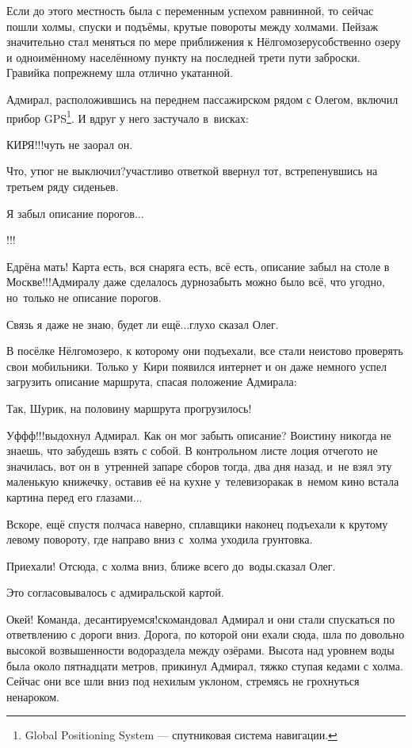 Если до этого местность была с переменным успехом равнинной, то сейчас пошли холмы, спуски и подъёмы, крутые повороты между холмами. Пейзаж значительно стал меняться по мере приближения к Нёлгомозеру\mdash собственно озеру и одноимённому населённому пункту на последней трети пути заброски. Гравийка по\sdash прежнему шла отлично укатанной.

Адмирал, расположившись на переднем пассажирском рядом с Олегом, включил прибор GPS\footnote{Global Positioning System --- спутниковая система навигации.}. И вдруг у него застучало в~висках:

\diagdash КИРЯ!!!\mdash чуть не заорал он.

\diagdash Что, утюг не выключил?\mdash участливо ответкой ввернул тот, встрепенувшись на третьем ряду сиденьев.

\diagdash Я забыл описание порогов$\ldots$

\diagdash !!!

\diagdash Едрёна мать! Карта есть, вся снаряга есть, всё есть, описание забыл на столе в Москве!!!\mdash Адмиралу даже сделалось дурно\mdash забыть можно было всё, что угодно, но~только не описание порогов. 

\diagdash Связь я даже не знаю, будет ли ещё$\ldots$\mdash глухо сказал Олег.

В посёлке Нёлгомозеро, к которому они подъехали, все стали неистово проверять свои мобильники. Только у~Кири появился интернет и он даже немного успел загрузить описание маршрута, спасая положение Адмирала:

\diagdash Так, Шурик, на половину маршрута прогрузилось!

\diagdash Уф\sdash ф\sdash ф!!!\mdash выдохнул Адмирал. Как он мог забыть описание? Воистину никогда не знаешь, что забудешь взять с собой. В контрольном листе лоция отчего\sdash то не значилась, вот он в~утренней запаре сборов тогда, два дня назад, и~не взял эту маленькую книжечку, оставив её на кухне у~телевизора\mdash как в~немом кино встала картина перед его глазами$\ldots$

Вскоре, ещё спустя полчаса наверно, сплавщики наконец подъехали к крутому левому повороту, где направо вниз с~холма уходила грунтовка. 

\diagdash Приехали! Отсюда, с холма вниз, ближе всего до~воды.\mdash сказал Олег.

Это согласовывалось с адмиральской картой. 

\diagdash Окей! Команда, десантируемся!\mdash скомандовал Адмирал и они стали спускаться по ответвлению с дороги вниз. Дорога, по которой они ехали сюда, шла по довольно высокой возвышенности водораздела между озёрами. Высота над уровнем воды была около пятнадцати метров, прикинул Адмирал, тяжко ступая кедами с холма. Сейчас они все шли вниз под нехилым уклоном, стремясь не грохнуться ненароком.

